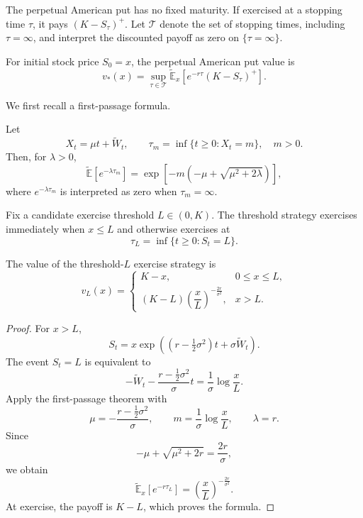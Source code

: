 The perpetual American put has no fixed maturity. If exercised at a stopping time $\tau$, it pays $(K-S_\tau)^+$. Let $\mathcal{T}$ denote the set of stopping times, including $\tau=\infty$, and interpret the discounted payoff as zero on $\{\tau=\infty\}$.

\begin{de}
For initial stock price $S_0=x$, the perpetual American put value is
\[
v_*(x)
=\sup_{\tau\in\mathcal{T}}
 \widetilde{\mathbb{E}}_x
 \left[e^{-r\tau}(K-S_\tau)^+\right].
\]
\end{de}

We first recall a first-passage formula.

\begin{thm}
Let
\[
X_t=\mu t+\widetilde W_t,
\qquad
\tau_m=\inf\{t\geq0:X_t=m\},
\quad m>0.
\]
Then, for $\lambda>0$,
\[
\widetilde{\mathbb{E}}\!\left[e^{-\lambda\tau_m}\right]
=\exp\!\left[-m\left(-\mu+\sqrt{\mu^2+2\lambda}\right)\right],
\]
where $e^{-\lambda\tau_m}$ is interpreted as zero when $\tau_m=\infty$.
\end{thm}

Fix a candidate exercise threshold $L\in(0,K)$. The threshold strategy exercises immediately when $x\leq L$ and otherwise exercises at
\[
\tau_L=\inf\{t\geq0:S_t=L\}.
\]

\begin{thm}
The value of the threshold-$L$ exercise strategy is
\[
v_L(x)
=\begin{cases}
K-x, & 0\leq x\leq L,\\[4pt]
(K-L)\left(\dfrac{x}{L}\right)^{-\frac{2r}{\sigma^2}},
& x>L.
\end{cases}
\]
\end{thm}

\begin{proof}
For $x>L$,
\[
S_t=x\exp\!\left(
(r-\tfrac12\sigma^2)t+\sigma\widetilde W_t
\right).
\]
The event $S_t=L$ is equivalent to
\[
-\widetilde W_t
-\frac{r-\frac12\sigma^2}{\sigma}t
=\frac1\sigma\log\frac{x}{L}.
\]
Apply the first-passage theorem with
\[
\mu=-\frac{r-\frac12\sigma^2}{\sigma},
\qquad
m=\frac1\sigma\log\frac{x}{L},
\qquad
\lambda=r.
\]
Since
\[
-\mu+\sqrt{\mu^2+2r}=\frac{2r}{\sigma},
\]
we obtain
\[
\widetilde{\mathbb{E}}_x[e^{-r\tau_L}]
=\left(\frac{x}{L}\right)^{-\frac{2r}{\sigma^2}}.
\]
At exercise, the payoff is $K-L$, which proves the formula.
\end{proof}

